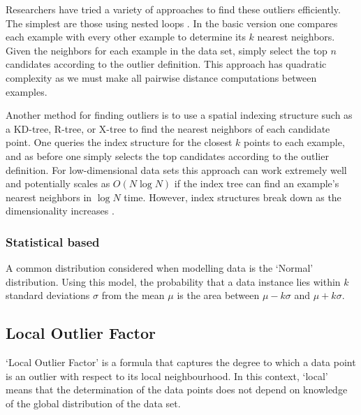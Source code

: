 Researchers have tried a variety of approaches to find these outliers 
efficiently. The simplest are those using nested loops \cite{Bay:2003}. In the 
basic version one compares each example with every other example to determine 
its $k$ nearest neighbors. Given the neighbors for each example in the data set,
simply select the top $n$ candidates according to the outlier definition. This 
approach has quadratic complexity as we must make all pairwise distance 
computations between examples.

Another method for finding outliers is to use a spatial indexing structure such 
as a KD-tree, R-tree, or X-tree to find the nearest neighbors of each candidate 
point. One queries the index structure for the closest $k$ points to each 
example, and as before one simply selects the top candidates according to the 
outlier definition. For low-dimensional data sets this approach can work 
extremely well and potentially scales as $O(N \log N)$ if the index tree can
find an example's nearest neighbors in $\log N$ time. However, index structures 
break down as the dimensionality increases \cite{Bay:2003}.

\subsubsection{Statistical based}
A common distribution considered when modelling data is the `Normal' 
distribution. Using this model, the probability that a data instance lies within
$k$ standard deviations $\sigma$ from the mean $\mu$ is the area between 
$\mu - k\sigma$ and $\mu + k\sigma$.

\subsection{Local Outlier Factor}
\label{sec:localOutlierFactor}
`Local Outlier Factor' is a formula that captures the degree to which a data 
point is an outlier with respect to its local neighbourhood. In this context,
`local' means that the determination of the data points does not depend on 
knowledge of the global distribution of the data set.
